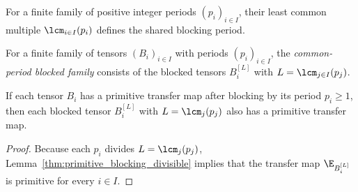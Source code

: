 \begin{definition}
    \label{def:lcm_period}
    \leanok
    For a finite family of positive integer periods $(p_i)_{i \in I}$, their
    least common multiple $\lcm_{i \in I}(p_i)$ defines the shared blocking
    period.
\end{definition}

\begin{definition}
    \label{def:common_period_blocking}
    \leanok
    For a finite family of tensors $(B_i)_{i \in I}$ with periods
    $(p_i)_{i \in I}$, the \emph{common-period blocked family} consists of the
    blocked tensors $B_i^{[L]}$ with $L = \lcm_{j \in I}(p_j)$.
\end{definition}

\begin{lemma}
    \label{thm:common_period_blocking_primitive}
    \leanok
    If each tensor $B_i$ has a primitive transfer map after blocking by its
    period $p_i \ge 1$, then each blocked tensor $B_i^{[L]}$ with
    $L = \lcm_j(p_j)$ also has a primitive transfer map.
\end{lemma}

\begin{proof}\leanok
    Because each $p_i$ divides $L = \lcm_j(p_j)$,
    Lemma~\ref{thm:primitive_blocking_divisible} implies that the transfer map
    $\E_{B_i^{[L]}}$ is primitive for every $i \in I$.
\end{proof}
